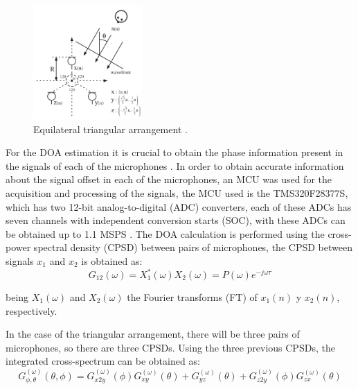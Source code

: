 \documentclass{llncs}
\begin{document}
\begin{figure}[h]
	\centering
	\includegraphics[width=0.37\textwidth]{Figures/array.png}
	\caption{Equilateral triangular arrangement \cite{hioka2003}.}
	\label{F_array}
\end{figure}


For the DOA estimation it is crucial to obtain the phase information present in the signals of each of the microphones \cite{karbasi2006}. In order to obtain accurate information about the signal offset in each of the microphones, an MCU was used for the acquisition and processing of the signals, the MCU used is the TMS320F28377S, which has two 12-bit analog-to-digital (ADC) converters, each of these ADCs has seven channels with independent conversion starts (SOC), with these ADCs can be obtained up to 1.1 MSPS \cite{DTASHT2}. The DOA calculation is performed using the cross-power spectral density (CPSD) between pairs of microphones, the CPSD between signals  $x_1$ and $x_2$ is obtained as:
\begin{equation}
	G_{12}(\omega) = X_1^{*}(\omega) X_2(\omega) = P(\omega)e^{-j\omega \tau}
\end{equation} 

being $X_1(\omega)$ and $X_2(\omega)$ the Fourier transforms (FT) of $x_1(n)$ y $x_2(n)$, respectively.%
%

In the case of the triangular arrangement, there will be three pairs of microphones, so there are three CPSDs. Using the three previous CPSDs, the integrated cross-spectrum can be obtained as:
\begin{equation} \label{eq_doa}
	G_{\phi,\theta}^{(\omega)} (\theta,\phi) = G_{x2y}^{(\omega)}(\phi)G_{xy}^{(\omega)}(\theta)+G_{yz}^{(\omega)}(\theta)+G_{z2y}^{(\omega)}(\phi)G_{zx}^{(\omega)}(\theta)
\end{equation}
\end{document}
